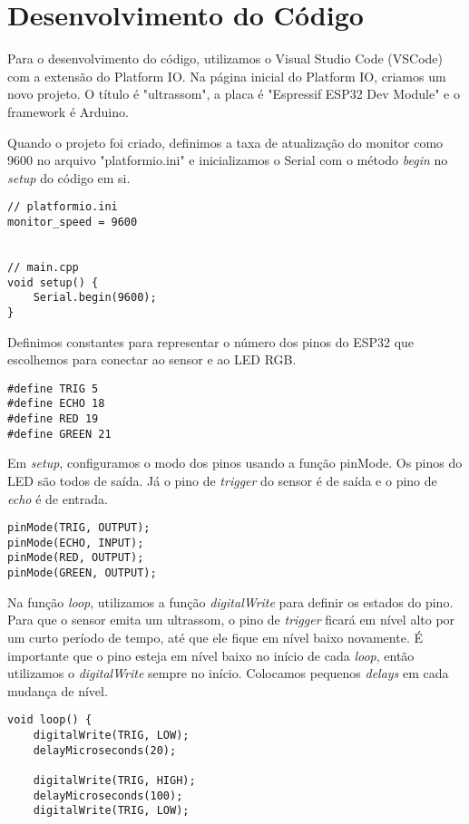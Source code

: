 \section{Desenvolvimento do Código}

Para o desenvolvimento do código, utilizamos o Visual Studio Code (VSCode) com a extensão do Platform IO. Na página inicial do Platform IO, criamos um novo projeto. O título é "ultrassom", a placa é "Espressif ESP32 Dev Module" e o framework é Arduino.

Quando o projeto foi criado, definimos a taxa de atualização do monitor como 9600 no arquivo "platformio.ini" e inicializamos o Serial com o método \textit{begin} no \textit{setup} do código em si.

\begin{lstlisting}
// platformio.ini
monitor_speed = 9600


// main.cpp
void setup() {
    Serial.begin(9600);
}

\end{lstlisting}

Definimos constantes para representar o número dos pinos do ESP32 que escolhemos para conectar ao sensor e ao LED RGB.

\begin{lstlisting}
#define TRIG 5
#define ECHO 18
#define RED 19
#define GREEN 21
\end{lstlisting}

Em \textit{setup}, configuramos o modo dos pinos usando a função pinMode. Os pinos do LED são todos de saída. Já o pino de \textit{trigger} do sensor é de saída e o pino de \textit{echo} é de entrada.

\begin{lstlisting}
pinMode(TRIG, OUTPUT);
pinMode(ECHO, INPUT);
pinMode(RED, OUTPUT);
pinMode(GREEN, OUTPUT);
\end{lstlisting}

Na função \textit{loop}, utilizamos a função \textit{digitalWrite} para definir os estados do pino. Para que o sensor emita um ultrassom, o pino de \textit{trigger} ficará em nível alto por um curto período de tempo, até que ele fique em nível baixo novamente. É importante que o pino esteja em nível baixo no início de cada \textit{loop}, então utilizamos o \textit{digitalWrite} sempre no início. Colocamos pequenos \textit{delays} em cada mudança de nível.

\begin{lstlisting}
void loop() {
    digitalWrite(TRIG, LOW);
    delayMicroseconds(20);
    
    digitalWrite(TRIG, HIGH);
    delayMicroseconds(100);
    digitalWrite(TRIG, LOW);
\end{lstlisting}

